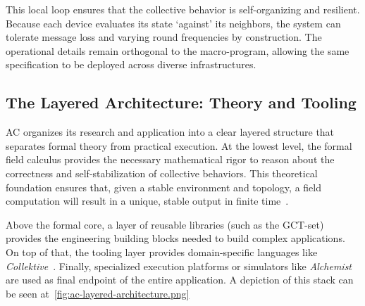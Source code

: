 
This local loop ensures that the collective behavior is self-organizing and resilient. Because each device evaluates its state `against' its neighbors, the system can tolerate message loss and varying round frequencies by construction. The operational details remain orthogonal to the macro-program, allowing the same specification to be deployed across diverse infrastructures.

\subsection{The Layered Architecture: Theory and Tooling}

\ac{AC} organizes its research and application into a clear layered structure that separates formal theory from practical execution. At the lowest level, the formal field calculus provides the necessary mathematical rigor to reason about the correctness and self-stabilization of collective behaviors. This theoretical foundation ensures that, given a stable environment and topology, a field computation will result in a unique, stable output in finite time~\cite{DBLP:conf/saso/ViroliBDP15}.

Above the formal core, a layer of reusable libraries (such as the GCT-set) provides the engineering building blocks needed to build complex applications. On top of that, the tooling layer provides domain-specific languages like \emph{Collektive}~\cite{DBLP:conf/acsos/Cortecchia24}. Finally, specialized execution platforms or simulators like \emph{Alchemist}~\cite{DBLP:conf/sac/PianiniVB15} are used as final endpoint of the entire application. A depiction of this stack can be seen at~\cref{fig:ac-layered-architecture.png}


